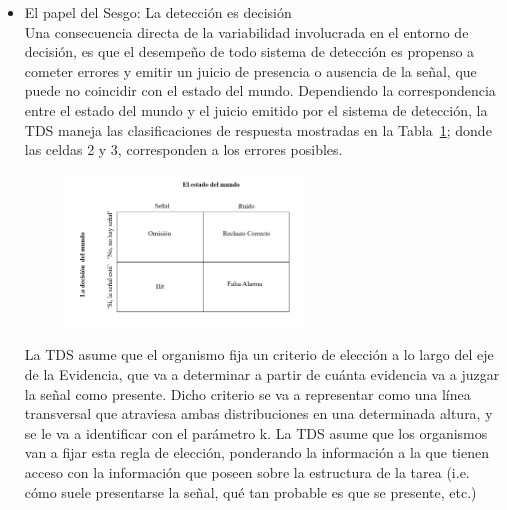 \begin{itemize}
El soporte de las distribuciones, identificado en la Figura 1 bajo el nombre de ‘Evidencia’ rara vez se define con precisión,  teniendo una concepción más bien abstracta; La idea general es que cuando queremos detectar una señal particular, comenzamos a recolectar un tipo de evidencia específico a la tarea ante la que nos encontramos. Lo más importante, es que la señal siempre va a estar asociada en mayor medida con dicha evidencia, distribuyéndose siempre en valores situados por encima (a la derecha, en la Figura 1) del ruido.\\
 
  \item{El papel del Sesgo: La detección es decisión}\\

Una consecuencia directa de la variabilidad involucrada en el entorno de decisión, es que el desempeño de todo sistema de detección es propenso a cometer errores y emitir un juicio de presencia o ausencia de la señal, que puede no coincidir con el estado del mundo. Dependiendo la correspondencia entre el estado del mundo y el juicio emitido por el sistema de detección, la TDS maneja las clasificaciones de respuesta mostradas en la Tabla~\ref{fig:Mat_Output}; donde las celdas 2 y 3, corresponden a los errores posibles.\\

\begin{figure}[th]
\centering
\includegraphics[width=0.60\textwidth]{Figures/Matriz_Outputs} 
\caption[Posibles Resultados en una Tarea de Detección]{}
\label{fig:Mat_Output}
\end{figure}

La TDS asume que el organismo fija un criterio de elección a lo largo del eje de la Evidencia, que va a determinar a partir de cuánta evidencia va a juzgar la señal como presente. Dicho criterio se va a representar como una línea transversal que atraviesa ambas distribuciones en una determinada altura, y se le va a identificar con el parámetro k. La TDS asume que los organismos van a fijar esta regla de elección, ponderando la información a la que tienen acceso con la información que poseen sobre la estructura de la tarea (i.e. cómo suele presentarse la señal, qué tan probable es que se presente, etc.)\\



\end{itemize}
